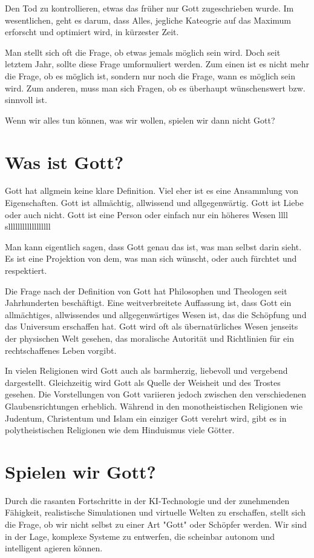 \documentclass[10pt]{article}
\begin{document}
Den Tod zu kontrollieren, etwas das früher nur Gott zugeschrieben wurde.
Im wesentlichen, geht es darum, dass Alles, jegliche Kateogrie auf das Maximum erforscht und optimiert wird, in kürzester Zeit.

\cite{Kurzweil}

Man stellt sich oft die Frage, ob etwas jemals möglich sein wird.
Doch seit letztem Jahr, sollte diese Frage umformuliert werden.
Zum einen ist es nicht mehr die Frage, ob es möglich ist, sondern nur noch die Frage, wann es möglich sein wird.
Zum anderen, muss man sich Fragen, ob es überhaupt wünschenswert bzw. sinnvoll ist.

Wenn wir alles tun können, was wir wollen, spielen wir dann nicht Gott?
\section{Was ist Gott?}
Gott hat allgmein keine klare Definition.
Viel eher ist es eine Ansammlung von Eigenschaften.
Gott ist allmächtig, allwissend und allgegenwärtig.
Gott ist Liebe oder auch nicht.
Gott ist eine Person oder einfach nur ein höheres Wesen llll sllllllllllllllllll

Man kann eigentlich sagen, dass Gott genau das ist, was man selbst darin sieht.
Es ist eine Projektion von dem, was man sich wünscht, oder auch fürchtet und respektiert.

Die Frage nach der Definition von Gott hat Philosophen und Theologen seit Jahrhunderten beschäftigt.
Eine weitverbreitete Auffassung ist, dass Gott ein allmächtiges, allwissendes und allgegenwärtiges Wesen ist, das die Schöpfung und das Universum erschaffen hat. Gott wird oft als übernatürliches Wesen jenseits der physischen Welt gesehen, das moralische Autorität und Richtlinien für ein rechtschaffenes Leben vorgibt.

In vielen Religionen wird Gott auch als barmherzig, liebevoll und vergebend dargestellt. Gleichzeitig wird Gott als Quelle der Weisheit und des Trostes gesehen. Die Vorstellungen von Gott variieren jedoch zwischen den verschiedenen Glaubensrichtungen erheblich. Während in den monotheistischen Religionen wie Judentum, Christentum und Islam ein einziger Gott verehrt wird, gibt es in polytheistischen Religionen wie dem Hinduismus viele Götter.

\section{Spielen wir Gott?}
Durch die rasanten Fortschritte in der KI-Technologie und der zunehmenden Fähigkeit, realistische Simulationen und virtuelle Welten zu erschaffen, stellt sich die Frage, ob wir nicht selbst zu einer Art "Gott" oder Schöpfer werden. Wir sind in der Lage, komplexe Systeme zu entwerfen, die scheinbar autonom und intelligent agieren können.
\end{document}
